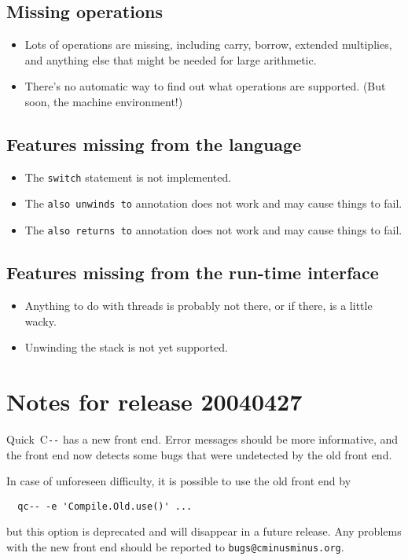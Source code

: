 \documentclass{article}
\def\PAL{\mbox{C{\texttt{-{}-}}}}
\begin{document}
\subsection{Missing operations}

\begin{itemize}
\item
Lots of operations are missing, including
carry, borrow, extended multiplies, and anything else that might be
needed for large arithmetic.
\item
There's no automatic way to find out what operations are supported.
(But soon, the machine environment!)
\end{itemize}

\subsection{Features missing from the language}

\begin{itemize}
\item
The \texttt{switch} statement is not implemented.
\item
The \texttt{also unwinds to} annotation does not work and may cause
things to fail.
\item
The \texttt{also returns to} annotation does not work and may cause
things to fail.
\end{itemize}


\subsection{Features missing from the run-time interface}
\begin{itemize}
\item
Anything to do with threads is probably not there, or if there, is a
little wacky.
\item
Unwinding the stack is not yet supported.
\end{itemize}


\section{Notes for release 20040427}

Quick~{\PAL} has a new front end.
Error messages should be more informative, and the front end now
detects some bugs that were undetected by the old front end.

In case of unforeseen difficulty, it is possible to use the old front
end by
\begin{verbatim}
  qc-- -e 'Compile.Old.use()' ...
\end{verbatim}
but this option is deprecated and will disappear in a future release.
Any problems with the new front end should be reported to
\texttt{bugs@cminusminus.org}. 
\end{document}
